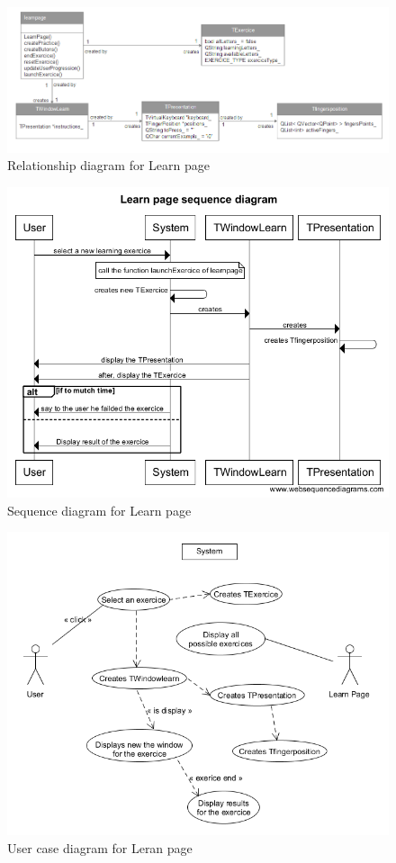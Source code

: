 \begin{figure}[H]
	\centering
	\includegraphics[width=12cm]{diagrams/Rlearnpage.png}
	\caption{Relationship diagram for Learn page}	
	\label{Rlearnpage}
\end{figure}
\begin{figure}[H]
	\centering
	\includegraphics[width=12cm]{diagrams/Slearnpage.png}
	\caption{Sequence diagram for Learn page}
	\label{Slearnpage}
\end{figure}
\begin{figure}[H]
	\centering
	\includegraphics[width=12cm]{diagrams/UClearnpage.png}
	\caption{User case diagram for Leran page}
	\label{UClearnpage}
\end{figure}

